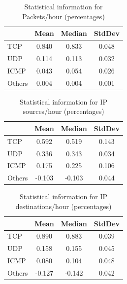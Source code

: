 \documentclass{article}
\begin{document}
\begin{table}[H]
    \centering
    \begin{tabular}{l|ccc}
               & Mean  & Median & StdDev \\
               \hline
        TCP    & 0.840 & 0.833  & 0.048 \\
        UDP    & 0.114 & 0.113  & 0.032 \\
        ICMP   & 0.043 & 0.054  & 0.026 \\
        Others & 0.004 & 0.004  & 0.001 \\
    \end{tabular}
    \caption{\label{table:rep-17-packets} Statistical information for Packets/hour (percentages)}
\end{table}

\begin{table}[H]
    \centering
    \begin{tabular}{l|ccc}
               & Mean  & Median & StdDev \\
               \hline
        TCP    &   0.592 & 0.519  & 0.143  \\
        UDP    &   0.336 & 0.343  & 0.034  \\
        ICMP   &   0.175 & 0.225  & 0.106  \\
        Others &  -0.103 & -0.103 & 0.044  \\
    \end{tabular}
    \caption{\label{table:rep-17-ips} Statistical information for IP sources/hour (percentages)}
\end{table}

\begin{table}[H]
    \centering
    \begin{tabular}{l|ccc}
               & Mean  & Median & StdDev \\
               \hline
        TCP    &  0.890 & 0.883&  0.039   \\
        UDP    &  0.158 & 0.155&  0.045   \\
        ICMP   &  0.080 & 0.104&  0.048   \\
        Others &  -0.127&  -0.142&  0.042 \\
    \end{tabular}
    \caption{\label{table:rep-17-ipd} Statistical information for IP destinations/hour (percentages)}
\end{table}

\end{document}
